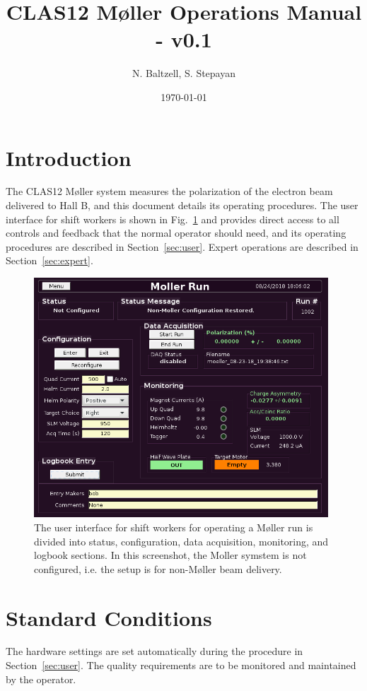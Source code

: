 \documentclass[amsmath,amssymb,notitlepage,12pt]{revtex4}
\begin{document}
\title{CLAS12 M{\o}ller Operations Manual - v0.1}
\date{\today}
\author{N. Baltzell, S. Stepayan}
\begin{abstract}
\end{abstract}

\maketitle

\section{Introduction}
The CLAS12 M{\o}ller system measures the polarization of the electron beam delivered to Hall B, and this document details its operating procedures.  The user interface for shift workers is shown in Fig.~\ref{fig:unconfig} and provides direct access to all controls and feedback that the normal operator should need, and its operating procedures are described in Section~\ref{sec:user}.  Expert operations are described in Section~\ref{sec:expert}.

\begin{figure}[htbp]\centering
    \includegraphics[width=11cm]{pics/unconfig}
    \caption{The user interface for shift workers for operating a M{\o}ller run is divided into status, configuration, data acquisition, monitoring, and logbook sections.  In this screenshot, the Moller symstem is not configured, i.e. the setup is for non-M{\o}ller beam delivery.\label{fig:unconfig}}
\end{figure}

\section{Standard Conditions}
The hardware settings are set automatically during the procedure in Section~\ref{sec:user}.  The quality requirements are to be monitored and maintained by the operator.
\end{document}

